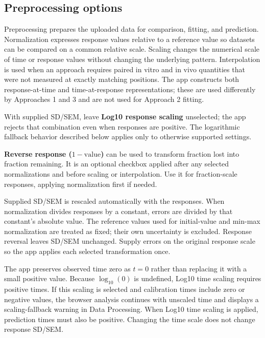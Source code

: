 \subsection{Preprocessing options}
\label{sec:preprocessing}

Preprocessing prepares the uploaded data for comparison, fitting, and prediction. Normalization expresses response values relative to a reference value so datasets can be compared on a common relative scale. Scaling changes the numerical scale of time or response values without changing the underlying pattern. Interpolation is used when an approach requires paired in vitro and in vivo quantities that were not measured at exactly matching positions. The app constructs both response-at-time and time-at-response representations; these are used differently by Approaches 1 and 3 and are not used for Approach 2 fitting.

With supplied SD/SEM, leave \textbf{Log10 response scaling} unselected; the app rejects that combination even when responses are positive. The logarithmic fallback behavior described below applies only to otherwise supported settings.



\textbf{Reverse response ($1-\mathrm{value}$)} can be used to transform fraction lost into fraction remaining. It is an optional checkbox applied after any selected normalizations and before scaling or interpolation. Use it for fraction-scale responses, applying normalization first if needed.

Supplied SD/SEM is rescaled automatically with the responses. When normalization divides responses by a constant, errors are divided by that constant's absolute value. The reference values used for initial-value and min-max normalization are treated as fixed; their own uncertainty is excluded. Response reversal leaves SD/SEM unchanged. Supply errors on the original response scale so the app applies each selected transformation once.

The app preserves observed time zero as $t=0$ rather than replacing it with a small positive value. Because $\log_{10}(0)$ is undefined, Log10 time scaling requires positive times. If this scaling is selected and calibration times include zero or negative values, the browser analysis continues with unscaled time and displays a scaling-fallback warning in Data Processing. When Log10 time scaling is applied, prediction times must also be positive. Changing the time scale does not change response SD/SEM.

